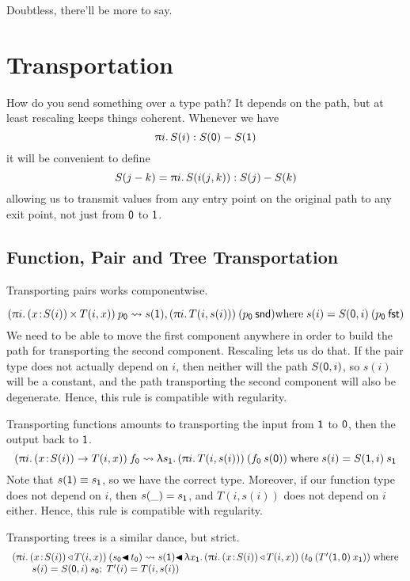 \documentclass{article}
\newcommand{\hb}{\!:\!}
\newcommand{\PI}[2]{\blue{(}#1\hb #2\blue{)\to\;}}
\newcommand{\SG}[2]{\blue{(}#1\hb #2\blue{)\,\times\,}}
\newcommand{\WW}[2]{\blue{(}#1\hb #2\blue{)\,\triangleleft\,}}
\newcommand{\PA}[2]{#1\mathbin{\blue{-}}#2}
\newcommand{\la}[1]{\red{\uplambda}#1.\,}
\newcommand{\pr}{\red{,}\,}
\newcommand{\tr}{\red{\blacktriangleleft}\,}
\newcommand{\pa}[1]{\red{\uppi}#1.\,}
\newcommand{\fst}{\:\green{\mathsf{fst}}}
\newcommand{\snd}{\:\green{\mathsf{snd}}}
\newcommand{\ze}{{\orange{\mathsf{0}}}}
\newcommand{\un}{{\orange{\mathsf{1}}}}
\newcommand{\mux}[3]{#1\orange{(}#2\orange{,}\,#3\orange{)}}
\begin{document}
Doubtless, there'll be more to say.


\section{Transportation}

How do you send something over a type path? It depends on the path,
but at least rescaling keeps things coherent. Whenever we have
\[
\pa i S(i) : \PA {S(\ze)}{S(\un)}
\]
it will be convenient to define
\[
S(j-k) = \pa i S(\mux ijk) : \PA {S(j)}{S(k)}
\]
allowing us to transmit values from any entry point on the original
path to any exit point, not just from $\ze$ to $\un$.


\subsection{Function, Pair and Tree Transportation}

Transporting pairs works componentwise.

\[
(\pa i \SG x {S(i)}{T(i,x)})\:p_\ze \leadsto
  s(\un) \pr (\pa i {T(i,s(i))})\:(p_\ze\snd)
  \mbox{where}\;s(i) = S(\ze,i)\:(p_\ze\fst)
\]
We need to be able to move the first component anywhere in order
to build the path for transporting the second component. Rescaling
lets us do that. If the pair type does not actually depend on $i$,
then neither will the path $S(\ze,i)$, so $s(i)$ will be a constant,
and the path transporting the second component will also be
degenerate. Hence, this rule is compatible with regularity.

Transporting functions amounts to transporting the input from $\un$
to $\ze$, then the output back to $\un$.
\[
(\pa i \PI x {S(i)}{T(i,x)})\:f_\ze \leadsto
  \la {s_\un} (\pa i {T(i, s(i))})\:(f_\ze\:s(\ze))\;
  \mbox{where}\;s(i) = S(\un,i)\:s_\un
\]
Note that $s(\un)\equiv s_\un$, so we have the correct type. Moreover,
if our function type does not depend on $i$, then $s(\_)=s_\un$,
and $T(i,s(i))$ does not depend on $i$ either. Hence, this rule
is compatible with regularity.

Transporting trees is a similar dance, but strict.
\[\begin{array}{l}
(\pa i \WW x {S(i)}{T(i,x)})\:(s_\ze\tr t_\ze) \leadsto
  s(\un)\tr \la {x_\un} (\pa i \WW x
  {S(i)}{T(i,x)})\:(t_\ze\:(T'(\un,\ze)\:x_\un))
\;\mbox{where}\\ \qquad s(i)=S(\ze,i)\:s_\ze;\;
  T'(i) = T(i, s(i))
\end{array}\]
\end{document}
